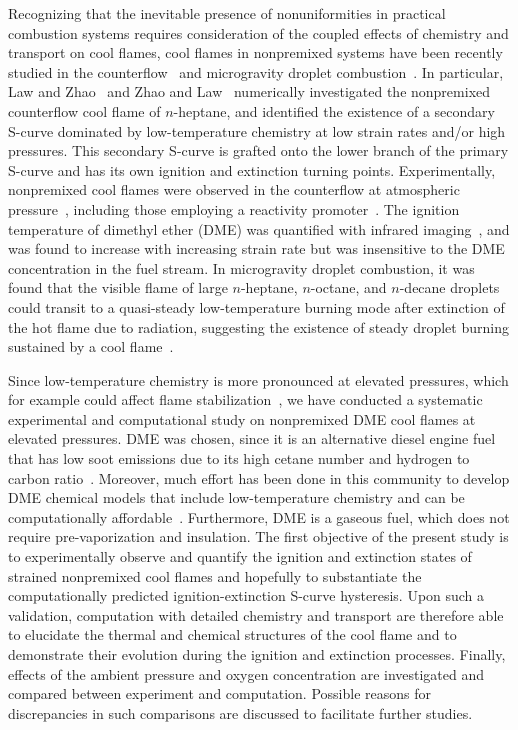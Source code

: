 \documentclass[review,3p,times]{elsarticle}
\begin{document}
Recognizing that the inevitable presence of nonuniformities in practical combustion systems requires consideration of the coupled effects of chemistry and transport on cool flames, cool flames in nonpremixed systems have been recently studied in the counterflow~\cite{law12,zhao13,deng14,won15} and microgravity droplet combustion~\cite{nayagam12,farouk15,nayagam15}.  In particular, Law and Zhao~\cite{law12} and Zhao and Law~\cite{zhao13} numerically investigated the nonpremixed counterflow cool flame of $n$-heptane, and identified the existence of a secondary S-curve dominated by low-temperature chemistry at low strain rates and/or high pressures.  This secondary S-curve is grafted onto the lower branch of the primary S-curve and has its own ignition and extinction turning points.  Experimentally, nonpremixed cool flames were observed in the counterflow at atmospheric pressure~\cite{deng14}, including those employing a reactivity promoter~\cite{won15,ju16}.  The ignition temperature of dimethyl ether (DME) was quantified with infrared imaging~\cite{deng14}, and was found to increase with increasing strain rate but was insensitive to the DME concentration in the fuel stream.  In microgravity droplet combustion, it was found that the visible flame of large $n$-heptane, $n$-octane, and $n$-decane droplets could transit to a quasi-steady low-temperature burning mode after extinction of the hot flame due to radiation, suggesting the existence of steady droplet burning sustained by a cool flame~\cite{nayagam15}.  

Since low-temperature chemistry is more pronounced at elevated pressures, which for example could affect flame stabilization~\cite{deng16}, we have conducted a systematic experimental and computational study on nonpremixed DME cool flames at elevated pressures. \textcolor{Rev1}{DME was chosen, since it is an alternative diesel engine fuel that has low soot emissions due to its high cetane number and hydrogen to carbon ratio~\cite{mcilroy00}.  Moreover, much effort has been done in this community to develop DME chemical models that include low-temperature chemistry and can be computationally affordable~\cite{zhao08,bhagatwala15}.  Furthermore, DME is a gaseous fuel, which does not require pre-vaporization and insulation.}  The first objective of the present study is to experimentally observe and quantify the ignition and extinction states of strained nonpremixed cool flames and hopefully to substantiate the computationally predicted ignition-extinction S-curve hysteresis.  Upon such a validation, computation with detailed chemistry and transport are therefore able to elucidate the thermal and chemical structures of the cool flame and to demonstrate their evolution during the ignition and extinction processes.  Finally, effects of the ambient pressure and oxygen concentration are investigated and compared between experiment and computation.  Possible reasons for discrepancies in such comparisons are discussed to facilitate further studies.
 
\end{document}
